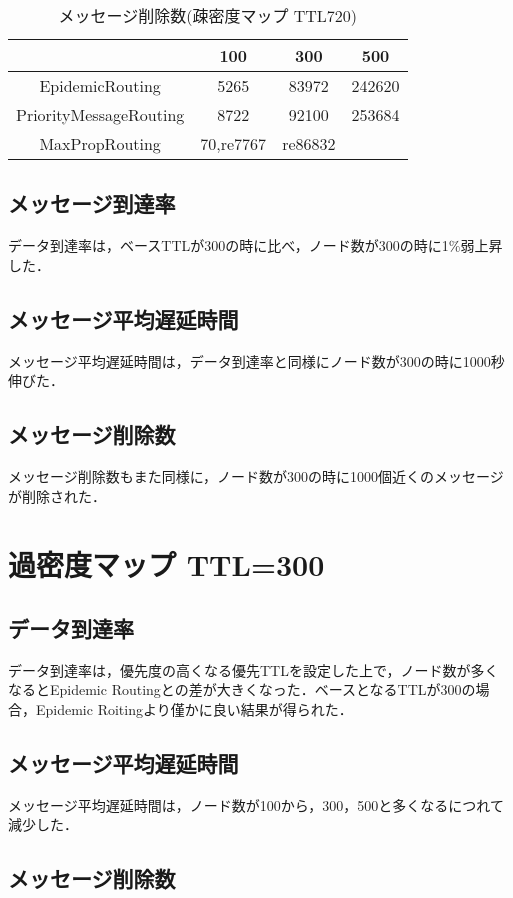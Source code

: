 \documentclass[11pt]{icsthesis}
\begin{document}
\begin{table}[H]
 \begin{center}
      \caption[]{メッセージ削除数(疎密度マップ TTL720)}
      \label{somituTtl720dropped}
      \begin{tabular}{|c|c|c|c|}
\hline
&100&300&500\\
\hline
EpidemicRouting&5265&83972&242620\\
\hline
PriorityMessageRouting&8722&92100&253684\\
\hline
MaxPropRouting&70,re7767&re86832&\\
\hline
      \end{tabular}
    \end{center}
\end{table}
\subsection{メッセージ到達率}
データ到達率は，ベースTTLが300の時に比べ，ノード数が300の時に1\%弱上昇した．
\subsection{メッセージ平均遅延時間}
メッセージ平均遅延時間は，データ到達率と同様にノード数が300の時に1000秒伸びた．
\subsection{メッセージ削除数}
メッセージ削除数もまた同様に，ノード数が300の時に1000個近くのメッセージが削除された．




\section{過密度マップ TTL=300}
\subsection{データ到達率}
データ到達率は，優先度の高くなる優先TTLを設定した上で，ノード数が多くなるとEpidemic Routingとの差が大きくなった．ベースとなるTTLが300の場合，Epidemic Roitingより僅かに良い結果が得られた．
\subsection{メッセージ平均遅延時間}
メッセージ平均遅延時間は，ノード数が100から，300，500と多くなるにつれて減少した．
\subsection{メッセージ削除数}
\end{document}
